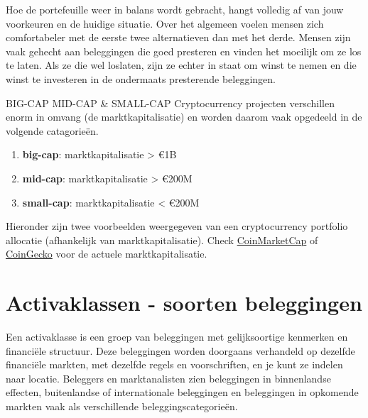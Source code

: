 Hoe de portefeuille weer in balans wordt gebracht, hangt volledig af van jouw voorkeuren en de huidige situatie. Over het algemeen voelen mensen zich comfortabeler met de eerste twee alternatieven dan met het derde. Mensen zijn vaak gehecht aan beleggingen die goed presteren en vinden het moeilijk om ze los te laten. Als ze die wel loslaten, zijn ze echter in staat om winst te nemen en die winst te investeren in de ondermaats presterende beleggingen. 

    \bigskip
    \begin{cryptobox}{BIG-CAP MID-CAP \& SMALL-CAP}
            Cryptocurrency projecten verschillen enorm in omvang (de marktkapitalisatie) en worden daarom vaak opgedeeld in de volgende catagorie\"en.
            
            \begin{enumerate}[label=(\alph*)]
            \setlength\itemsep{0em}
                \item \textbf{big-cap}: marktkapitalisatie > \euro 1B 
                \item \textbf{mid-cap}: marktkapitalisatie > \euro 200M
                \item \textbf{small-cap}: marktkapitalisatie < \euro 200M
            \end{enumerate}
            
            Hieronder zijn twee voorbeelden weergegeven van een cryptocurrency portfolio allocatie (afhankelijk van marktkapitalisatie). Check \href{https://coinmarketcap.com/}{CoinMarketCap} of \href{https://www.coingecko.com/en}{CoinGecko} voor de actuele marktkapitalisatie. 
            
            \tcblower
               
                
    \end{cryptobox}

\section{Activaklassen - soorten beleggingen}
\label{sec:activaklassen}

Een activaklasse is een groep van beleggingen met gelijksoortige kenmerken en financi\"ele structuur. Deze beleggingen worden doorgaans verhandeld op dezelfde financi\"ele markten, met dezelfde regels en voorschriften, en je kunt ze indelen naar locatie. Beleggers en marktanalisten zien beleggingen in binnenlandse effecten, buitenlandse of internationale beleggingen en beleggingen in opkomende markten vaak als verschillende beleggingscategorie\"en. 


